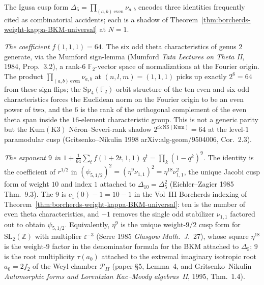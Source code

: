 \begin{remark}
\label{rem:cydkappa-delta5-theta-product-structures}
The Igusa cusp form
$\Delta_5 = \prod_{(a,b)\ \mathrm{even}} \nu_{a,b}$
encodes three identities frequently cited as combinatorial
accidents; each is a shadow of
Theorem~\ref{thm:borcherds-weight-kappa-BKM-universal} at
$N = 1$.

\emph{The coefficient $f(1,1,1) = 64$.} The six odd theta
characteristics of genus $2$ generate, via the Mumford sign-lemma
(Mumford \emph{Tata Lectures on Theta II}, 1984, Prop.~3.2), a rank-$6$
$\mathbb{F}_2$-vector space of normalizations at the Fourier origin.
The product $\prod_{(a,b)\ \mathrm{even}} \nu_{a,b}$ at
$(n,l,m) = (1,1,1)$ picks up exactly $2^6 = 64$ from these sign
flips; the $\mathrm{Sp}_4(\mathbb{F}_2)$-orbit structure of the ten
even and six odd characteristics forces the Euclidean norm on the
Fourier origin to be an even power of two, and the $6$ is the
rank of the orthogonal complement of the even theta span inside the
$16$-element characteristic group. This is not a generic parity but
the $\mathrm{Kum}(\mathrm{K3})$ N\'eron--Severi-rank shadow
$2^{\mathrm{rk}\,\mathrm{NS}(\mathrm{Kum})} = 64$ at the level-$1$
paramodular cusp (Gritsenko--Nikulin 1998 arXiv:alg-geom/9504006,
Cor.~2.3).

\emph{The exponent $9$ in
$1 + \tfrac{1}{64}\sum_t f(1+2t,1,1)\,q^t = \prod_k (1-q^k)^9$.}
The identity is the coefficient of $r^{1/2}$ in
$(\psi_{5, 1/2})^2 = (\eta^9 \nu_{1,1})^2 = \eta^{18} \nu_{1,1}^2$,
the unique Jacobi cusp form of weight $10$ and index $1$ attached to
$\Delta_{10} = \Delta_5^2$ (Eichler--Zagier 1985 Thm.~9.3). The
$9$ is $c_1(0) - 1 = 10 - 1$ in the Vol~III Borcherds-indexing of
Theorem~\ref{thm:borcherds-weight-kappa-BKM-universal}: ten is the
number of even theta characteristics, and $-1$ removes the single
odd stabilizer $\nu_{1,1}$ factored out to obtain $\psi_{5,1/2}$.
Equivalently, $\eta^9$ is the unique weight-$9/2$ cusp form for
$\mathrm{SL}_2(\mathbb{Z})$ with multiplier
$\varepsilon^{-3}$ (Serre 1985 \emph{Glasgow Math.~J.}~27), whose
square $\eta^{18}$ is the weight-$9$ factor in the denominator
formula for the BKM attached to $\Delta_5$; $9$ is the root
multiplicity $\tau(a_0)$ attached to the extremal imaginary
isotropic root $a_0 = 2f_2$ of the Weyl chamber
$\mathcal{P}_{II}$ (paper \S5, Lemma~4, and
Gritsenko--Nikulin \emph{Automorphic forms and Lorentzian
Kac--Moody algebras~II}, 1995, Thm.~1.4).


\end{remark}
